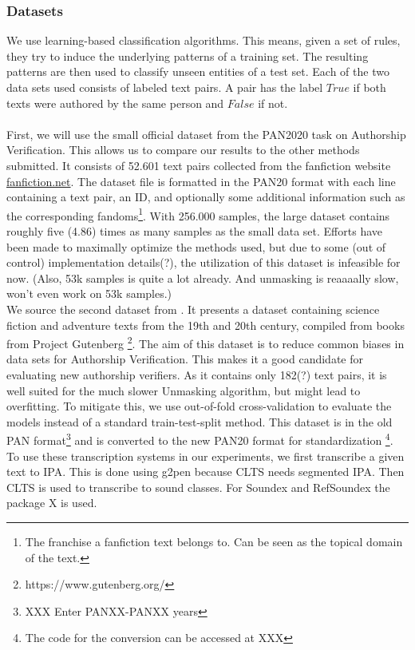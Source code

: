 \subsubsection{Datasets}
We use learning-based classification algorithms. This means, given a set of rules, they try to induce the underlying patterns of a training set. The resulting patterns are then used to classify unseen entities of a test set. Each of the two data sets used consists of labeled text pairs. A pair has the label $True$ if both texts were authored by the same person and $False$ if not.\\\\
First, we will use the small official dataset from the PAN2020 task on Authorship Verification. This allows us to compare our results to the other methods submitted. It consists of 52.601 text pairs collected from the fanfiction website \url{fanfiction.net}. The dataset file is formatted in the PAN20 format with each line containing a text pair, an ID, and optionally some additional information such as the corresponding fandoms\footnote{The franchise a fanfiction text belongs to. Can be seen as the topical domain of the text.}. With 256.000 samples, the large dataset contains roughly five (4.86) times as many samples as the small data set. Efforts have been made to maximally optimize the methods used, but due to some (out of control) implementation details(?), the utilization of this dataset is infeasible for now. (Also, 53k samples is quite a lot already. And unmasking is reaaaally slow, won't even work on 53k samples.)\\
We source the second dataset from \cite{stein2019unbiasedGutenbergCorpus}. It presents a dataset containing science fiction and adventure texts from the 19th and 20th century, compiled from books from Project Gutenberg \footnote{https://www.gutenberg.org/}. The aim of this dataset is to reduce common biases in data sets for Authorship Verification. This makes it a good candidate for evaluating new authorship verifiers. As it contains only 182(?) text pairs, it is well suited for the much slower Unmasking algorithm, but might lead to overfitting. To mitigate this, we use out-of-fold cross-validation to evaluate the models instead of a standard train-test-split method. This dataset is in the old PAN format\footnote{XXX Enter PANXX-PANXX years} and is converted to the new PAN20 format for standardization \footnote{The code for the conversion can be accessed at XXX}.\\
To use these transcription systems in our experiments, we first transcribe a given text to IPA.
This is done using g2pen because CLTS needs segmented IPA.  %
Then CLTS is used to transcribe to sound classes.
For Soundex and RefSoundex the package X is used.



